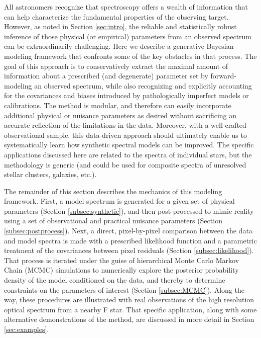 \documentclass[iop,floatfix]{emulateapj}
\begin{document}
All astronomers recognize that spectroscopy offers a wealth of information that can help 
characterize the fundamental properties of the observing target.  However, as noted in Section 
\ref{sec:intro}, the reliable and statistically robust inference of those physical (or empirical) 
parameters from an observed spectrum can be extraordinarily challenging.  Here we describe a 
generative Bayesian modeling framework that confronts some of the key obstacles in that process.  
The goal of this approach is to conservatively extract the maximal amount of information about a 
prescribed (and degenerate) parameter set by forward-modeling an observed spectrum, while also 
recognizing and explicitly accounting for the covariances and biases introduced by pathologically 
imperfect models or calibrations.  The method is modular, and therefore can easily incorporate 
additional physical or nuisance parameters as desired without sacrificing an accurate reflection of 
the limitations in the data.  Moreover, with a well-crafted observational sample, this data-driven 
approach should ultimately enable us to systematically learn how synthetic spectral models can be 
improved.  The specific applications discussed here are related to the spectra of individual stars, 
but the methodology is generic (and could be used for composite spectra of unresolved stellar 
clusters, galaxies, etc.).  

The remainder of this section describes the mechanics of this modeling framework.  First, a model 
spectrum is generated for a given set of physical parameters (Section \ref{subsec:synthetic}), and 
then post-processed to mimic reality using a set of observational and practical nuisance parameters 
(Section \ref{subsec:postprocess}).  Next, a direct, pixel-by-pixel comparison between the data and 
model spectra is made with a prescribed likelihood function and a parametric treatment of the 
covariances between pixel residuals (Section \ref{subsec:likelihood}).  That process is iterated 
under the guise of hierarchical Monte Carlo Markov Chain (MCMC) simulations to numerically explore 
the posterior probability density of the model conditioned on the data, and thereby to determine 
constraints on the parameters of interest (Section \ref{subsec:MCMC}).  Along the way, these 
procedures are illustrated with real observations of the high resolution optical spectrum from a 
nearby F star.  That specific application, along with some alternative demonstrations of the 
method, are discussed in more detail in Section \ref{sec:examples}.
\end{document}
